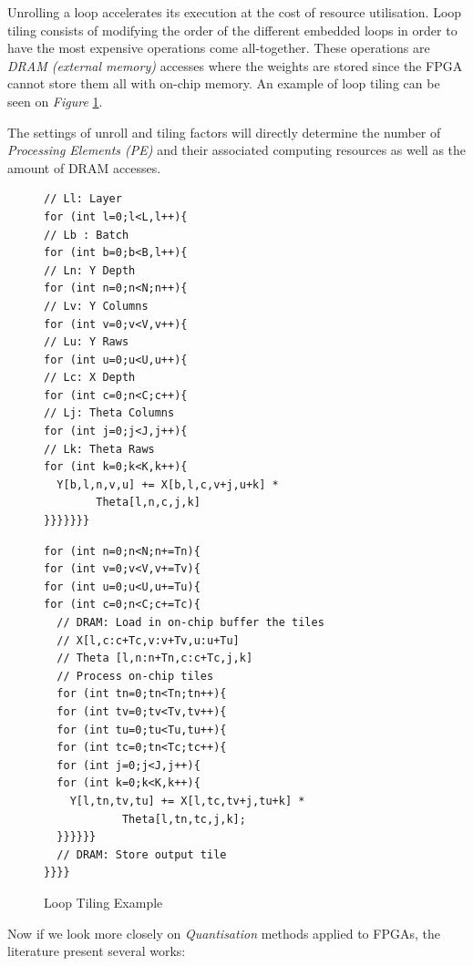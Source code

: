 Unrolling a loop accelerates its execution at the cost of resource utilisation. Loop tiling consists of modifying the order of the different embedded loops in order to have the most expensive operations come all-together. These operations are \emph{DRAM (external memory)} accesses where the weights are stored since the FPGA cannot store them all with on-chip memory. An example of loop tiling can be seen on \emph{Figure} \ref{fig:LoopTiling}.

The settings of unroll and tiling factors will directly determine the number of \emph{Processing Elements (PE)} and their associated computing resources as well as the amount of DRAM accesses.

\begin{figure}[htbp]
\centering
\begin{minipage}{.48\textwidth}
\begin{lstlisting}[style=CInputStyle]
// Ll: Layer
for (int l=0;l<L,l++){
// Lb : Batch
for (int b=0;b<B,l++){
// Ln: Y Depth
for (int n=0;n<N;n++){
// Lv: Y Columns
for (int v=0;v<V,v++){
// Lu: Y Raws
for (int u=0;u<U,u++){
// Lc: X Depth
for (int c=0;n<C;c++){
// Lj: Theta Columns
for (int j=0;j<J,j++){
// Lk: Theta Raws
for (int k=0;k<K,k++){
  Y[b,l,n,v,u] += X[b,l,c,v+j,u+k] *
        Theta[l,n,c,j,k]
}}}}}}}
\end{lstlisting}
\end{minipage}
\hfill
\begin{minipage}{.48\textwidth}
\begin{lstlisting}[style=CInputStyle]
for (int n=0;n<N;n+=Tn){
for (int v=0;v<V,v+=Tv){
for (int u=0;u<U,u+=Tu){
for (int c=0;n<C;c+=Tc){
  // DRAM: Load in on-chip buffer the tiles
  // X[l,c:c+Tc,v:v+Tv,u:u+Tu]
  // Theta [l,n:n+Tn,c:c+Tc,j,k]
  // Process on-chip tiles
  for (int tn=0;tn<Tn;tn++){
  for (int tv=0;tv<Tv,tv++){
  for (int tu=0;tu<Tu,tu++){
  for (int tc=0;tn<Tc;tc++){
  for (int j=0;j<J,j++){
  for (int k=0;k<K,k++){
    Y[l,tn,tv,tu] += X[l,tc,tv+j,tu+k] *
            Theta[l,tn,tc,j,k];
  }}}}}}
  // DRAM: Store output tile
}}}}
\end{lstlisting}
\end{minipage}
\caption[LoopTiling]{Loop Tiling Example \cite{Abdelouahab2018}}
	\label{fig:LoopTiling}
\end{figure}

Now if we look more closely on \emph{Quantisation} methods applied to FPGAs, the literature present several works:

